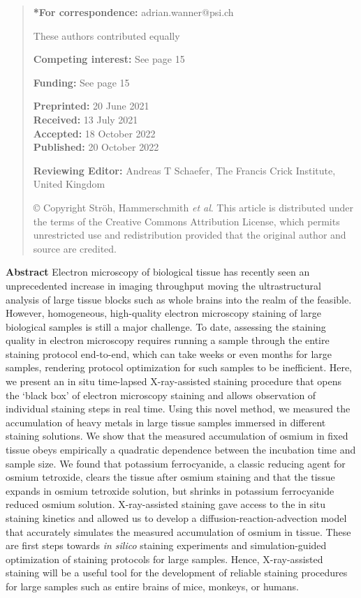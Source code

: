 \documentclass{article}
\begin{document}
\begin{quote}\small
\noindent\textbf{*For correspondence:} adrian.wanner@psi.ch

\noindent *These authors contributed equally

\noindent\textbf{Competing interest:} See page 15

\noindent\textbf{Funding:} See page 15

\noindent\textbf{Preprinted:} 20 June 2021\\
\textbf{Received:} 13 July 2021\\
\textbf{Accepted:} 18 October 2022\\
\textbf{Published:} 20 October 2022

\noindent\textbf{Reviewing Editor:} Andreas T Schaefer, The Francis Crick Institute, United Kingdom

\noindent © Copyright Ströh, Hammerschmith \emph{et al}. This article is distributed under the terms of the Creative Commons Attribution License, which permits unrestricted use and redistribution provided that the original author and source are credited.
\end{quote}

\noindent\textbf{Abstract} Electron microscopy of biological tissue has recently seen an unprecedented increase in imaging throughput moving the ultrastructural analysis of large tissue blocks such as whole brains into the realm of the feasible. However, homogeneous, high-quality electron microscopy staining of large biological samples is still a major challenge. To date, assessing the staining quality in electron microscopy requires running a sample through the entire staining protocol end-to-end, which can take weeks or even months for large samples, rendering protocol optimization for such samples to be inefficient. Here, we present an in situ time-lapsed X-ray-assisted staining procedure that opens the ‘black box’ of electron microscopy staining and allows observation of individual staining steps in real time. Using this novel method, we measured the accumulation of heavy metals in large tissue samples immersed in different staining solutions. We show that the measured accumulation of osmium in fixed tissue obeys empirically a quadratic dependence between the incubation time and sample size. We found that potassium ferrocyanide, a classic reducing agent for osmium tetroxide, clears the tissue after osmium staining and that the tissue expands in osmium tetroxide solution, but shrinks in potassium ferrocyanide reduced osmium solution. X-ray-assisted staining gave access to the in situ staining kinetics and allowed us to develop a diffusion-reaction-advection model that accurately simulates the measured accumulation of osmium in tissue. These are first steps towards \emph{in silico} staining experiments and simulation-guided optimization of staining protocols for large samples. Hence, X-ray-assisted staining will be a useful tool for the development of reliable staining procedures for large samples such as entire brains of mice, monkeys, or humans.
\end{document}

